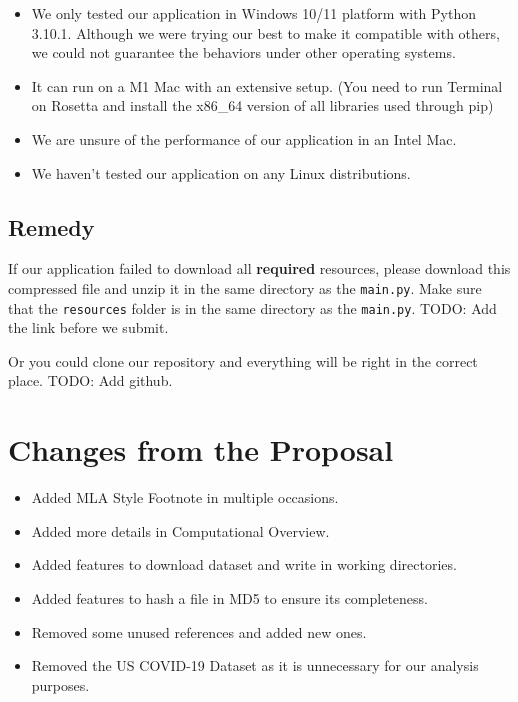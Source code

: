 \documentclass[fontsize=11pt]{article}
\begin{document}
    \begin{itemize}
        \item We only tested our application in Windows 10/11 platform with Python 3.10.1. Although we were trying our best to make it compatible with others, we could not guarantee the behaviors under other operating systems.
        \item It can run on a M1 Mac with an extensive setup. (You need to run Terminal on Rosetta and install the x86\_64 version of all libraries used through pip)
        \item We are unsure of the performance of our application in an Intel Mac.
        \item We haven't tested our application on any Linux distributions.
    \end{itemize}

    \subsection{Remedy}

    If our application failed to download all \textbf{required} resources, please download this compressed file and unzip it in the same directory as the \verb|main.py|. Make sure that the \verb|resources| folder is in the same directory as the \verb|main.py|. TODO: Add the link before we submit.

    Or you could clone our repository and everything will be right in the correct place. TODO: Add github.

    \section{Changes from the Proposal}

    \begin{itemize}
        \item Added MLA Style Footnote in multiple occasions.
        \item Added more details in Computational Overview.
        \item Added features to download dataset and write in working directories.
        \item Added features to hash a file in MD5 to ensure its completeness.
        \item Removed some unused references and added new ones.
        \item Removed the US COVID-19 Dataset as it is unnecessary for our analysis purposes.
    \end{itemize}
\end{document}
